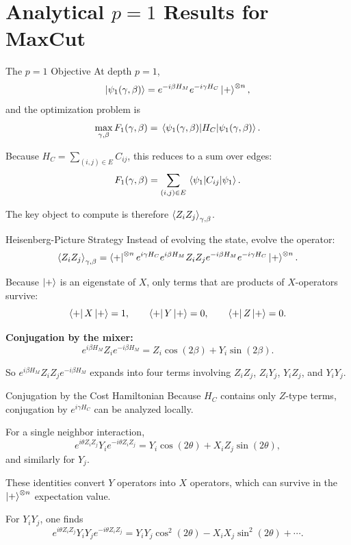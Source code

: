 \documentclass[aspectratio=169]{beamer}
\begin{document}
\section{Analytical \texorpdfstring{\(p=1\)}{p=1} Results for MaxCut}

\begin{frame}{The \(p=1\) Objective}
At depth \(p=1\),
\[
\ket{\psi_1(\gamma,\beta)}
=
e^{-i\beta H_M}e^{-i\gamma H_C}\ket{+}^{\otimes n},
\]
and the optimization problem is
\[
\max_{\gamma,\beta}
F_1(\gamma,\beta)
=
\ev{H_C}{\psi_1(\gamma,\beta)}.
\]

Because \(H_C=\sum_{(i,j)\in E}C_{ij}\), this reduces to a sum over edges:
\[
F_1(\gamma,\beta)
=
\sum_{(i,j)\in E} \ev{C_{ij}}{\psi_1}.
\]

The key object to compute is therefore \(\ev{Z_iZ_j}_{\gamma,\beta}\).
\end{frame}

\begin{frame}{Heisenberg-Picture Strategy}
Instead of evolving the state, evolve the operator:
\[
\ev{Z_iZ_j}_{\gamma,\beta}
=
\bra{+}^{\otimes n}
e^{i\gamma H_C}
e^{i\beta H_M}
Z_iZ_j
e^{-i\beta H_M}
e^{-i\gamma H_C}
\ket{+}^{\otimes n}.
\]

Because \(\ket{+}\) is an eigenstate of \(X\), only terms that are products
of \(X\)-operators survive:
\[
\bra{+} X \ket{+}=1,\qquad
\bra{+} Y \ket{+}=0,\qquad
\bra{+} Z \ket{+}=0.
\]

\textbf{Conjugation by the mixer:}
\[
e^{i\beta H_M} Z_i e^{-i\beta H_M}
=
Z_i\cos(2\beta)+Y_i\sin(2\beta).
\]

So \(e^{i\beta H_M}Z_iZ_je^{-i\beta H_M}\) expands into four terms involving
\(Z_iZ_j\), \(Z_iY_j\), \(Y_iZ_j\), and \(Y_iY_j\).
\end{frame}

\begin{frame}{Conjugation by the Cost Hamiltonian}
Because \(H_C\) contains only \(Z\)-type terms, conjugation by
\(e^{i\gamma H_C}\) can be analyzed locally.

For a single neighbor interaction,
\[
e^{i\theta Z_iZ_j} Y_i e^{-i\theta Z_iZ_j}
=
Y_i\cos(2\theta)+X_i Z_j\sin(2\theta),
\]
and similarly for \(Y_j\).

These identities convert \(Y\) operators into \(X\) operators, which can survive
in the \(\ket{+}^{\otimes n}\) expectation value.

For \(Y_iY_j\), one finds
\[
e^{i\theta Z_iZ_j} Y_iY_j e^{-i\theta Z_iZ_j}
= Y_iY_j\cos^2(2\theta) - X_iX_j\sin^2(2\theta) + \cdots.
\]
\end{frame}
\end{document}
